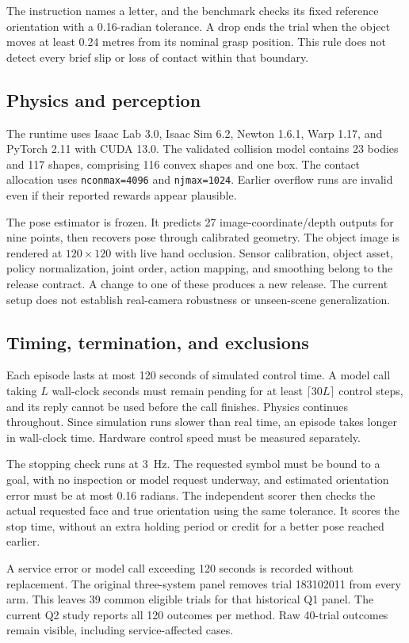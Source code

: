 The instruction names a letter, and the benchmark checks its fixed reference orientation with a 0.16-radian tolerance. A drop ends the trial when the object moves at least 0.24 metres from its nominal grasp position. This rule does not detect every brief slip or loss of contact within that boundary.

\subsection{Physics and perception}
The runtime uses Isaac Lab 3.0, Isaac Sim 6.2, Newton 1.6.1, Warp 1.17, and PyTorch 2.11 with CUDA 13.0. The validated collision model contains 23 bodies and 117 shapes, comprising 116 convex shapes and one box. The contact allocation uses \texttt{nconmax=4096} and \texttt{njmax=1024}. Earlier overflow runs are invalid even if their reported rewards appear plausible.

The pose estimator is frozen. It predicts 27 image-coordinate/depth outputs for nine points, then recovers pose through calibrated geometry. The object image is rendered at $120\times120$ with live hand occlusion. Sensor calibration, object asset, policy normalization, joint order, action mapping, and smoothing belong to the release contract. A change to one of these produces a new release. The current setup does not establish real-camera robustness or unseen-scene generalization.

\subsection{Timing, termination, and exclusions}
Each episode lasts at most 120 seconds of simulated control time. A model call taking $L$ wall-clock seconds must remain pending for at least $\lceil30L\rceil$ control steps, and its reply cannot be used before the call finishes. Physics continues throughout. Since simulation runs slower than real time, an episode takes longer in wall-clock time. Hardware control speed must be measured separately.

The stopping check runs at 3~Hz. The requested symbol must be bound to a goal, with no inspection or model request underway, and estimated orientation error must be at most 0.16 radians. The independent scorer then checks the actual requested face and true orientation using the same tolerance. It scores the stop time, without an extra holding period or credit for a better pose reached earlier.

A service error or model call exceeding 120 seconds is recorded without replacement. The original three-system panel removes trial 183102011 from every arm. This leaves 39 common eligible trials for that historical Q1 panel. The current Q2 study reports all 120 outcomes per method. Raw 40-trial outcomes remain visible, including service-affected cases.

